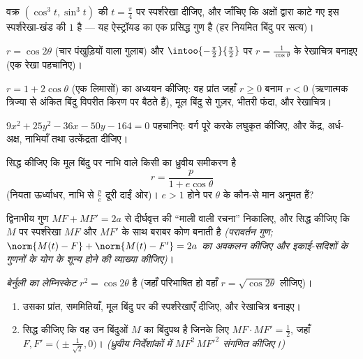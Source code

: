 \begin{exercise}[$\star$]\label{exo:b1:curves:3}
वक्र $(\cos^3 t, \sin^3 t)$ की $t = \frac\pi4$ पर स्पर्शरेखा दीजिए, और
जाँचिए कि अक्षों द्वारा काटे गए इस स्पर्शरेखा-खंड की  $1$ है --- यह
ऐस्ट्रॉयड का एक प्रसिद्ध गुण है (हर नियमित बिंदु पर सत्य)।
\end{exercise}

\begin{exercise}[$\star$]\label{exo:b1:curves:4}
 $r = \cos 2\theta$ (चार पंखुड़ियों वाला गुलाब) और
$\intoo{-\frac\pi2}{\frac\pi2}$ पर $r = \frac{1}{\cos\theta}$ के रेखाचित्र
बनाइए (एक रेखा पहचानिए)।
\end{exercise}

\begin{exercise}[$\star\star$]\label{exo:b1:curves:5}
 $r = 1 + 2\cos\theta$ (एक लिमासों) का अध्ययन कीजिए: वह प्रांत
जहाँ $r \geq 0$ बनाम $r < 0$ (ऋणात्मक त्रिज्या से अंकित बिंदु विपरीत किरण पर
बैठते हैं), मूल बिंदु से गुज़र, भीतरी फंदा, और रेखाचित्र।
\end{exercise}

\begin{exercise}[$\star\star$]\label{exo:b1:curves:6}
 $9x^2 + 25y^2 - 36x - 50y - 164 = 0$ पहचानिए: वर्ग पूरे करके लघुकृत
कीजिए, और केंद्र, अर्ध-अक्ष, नाभियाँ तथा उत्केंद्रता दीजिए।
\end{exercise}

\begin{exercise}[$\star\star$]\label{exo:b1:curves:7}
सिद्ध कीजिए कि मूल बिंदु पर नाभि वाले किसी  का ध्रुवीय समीकरण है
\[
r = \frac{p}{1 + e\cos\theta}
\]
(नियता ऊर्ध्वाधर, नाभि से $\frac pe$ दूरी दाईं ओर)। $e > 1$ होने पर $\theta$
के कौन-से मान अनुमत हैं?
\end{exercise}

\begin{exercise}[$\star\star$]\label{exo:b1:curves:8}
द्विनाभीय गुण $MF + MF' = 2a$ से दीर्घवृत्त की ``माली वाली रचना'' निकालिए,
और सिद्ध कीजिए कि $M$ पर स्पर्शरेखा $MF$ और $MF'$ के साथ बराबर कोण बनाती है
\emph{(परावर्तन गुण; $\norm{M(t) - F} + \norm{M(t) - F'} = 2a$ का अवकलन
कीजिए और इकाई-सदिशों के गुणनों के योग के शून्य होने की व्याख्या कीजिए)}।
\end{exercise}

\begin{exercise}[$\star\star\star$]\label{exo:b1:curves:9}
\emph{बेर्नुली का लेम्निस्केट}  $r^2 = \cos 2\theta$ है (जहाँ
परिभाषित हो वहाँ $r = \sqrt{\cos2\theta}$ लीजिए)।
\begin{enumerate}
  \item उसका प्रांत, सममितियाँ, मूल बिंदु पर की स्पर्शरेखाएँ दीजिए, और
  रेखाचित्र बनाइए।
  \item सिद्ध कीजिए कि वह उन बिंदुओं $M$ का बिंदुपथ है जिनके लिए $MF \cdot
  MF' = \frac12$, जहाँ $F, F' = \bigl(\pm\frac{1}{\sqrt2}, 0\bigr)$।
  \emph{(ध्रुवीय निर्देशांकों में $MF^2\,MF'^2$ संगणित कीजिए।)}
\end{enumerate}
\end{exercise}

